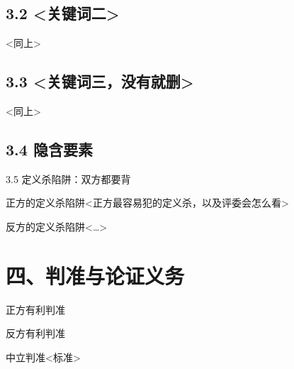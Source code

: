 \documentclass[prep,both]{debate}
\begin{document}
\subsection{3.2 <关键词二>}
<同上>

\subsection{3.3 <关键词三，没有就删>}
<同上>

\subsection{3.4 隐含要素}
\begin{fields}
\end{fields}

\begin{warnbox}{3.5 定义杀陷阱：双方都要背}
\begin{fields}
\begin{procard}{正方的定义杀陷阱}<正方最容易犯的定义杀，以及评委会怎么看>\end{procard}
\begin{concard}{反方的定义杀陷阱}<…>\end{concard}
\end{fields}
\end{warnbox}

\section{四、判准与论证义务}
\begin{fields}
\begin{procard}{正方有利判准}\end{procard}
\begin{concard}{反方有利判准}\end{concard}
\begin{neutralcard}{中立判准}<标准>\end{neutralcard}
\end{fields}
\end{document}

